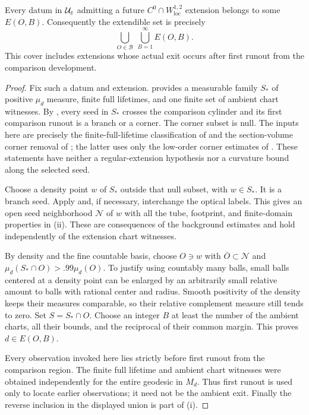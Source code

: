 \begin{proposition}
\label{prop:exit-cover}
Every datum in $\mathcal U_{\varepsilon}$ admitting a future
$C^0\cap W^{1,2}_{\mathrm{loc}}$ extension belongs to some
$E(O,B)$.  Consequently the extendible set is precisely
\[
                  \bigcup_{O\in\mathcal B}\ 
                         \bigcup_{B=1}^{\infty}E(O,B).
\]
This cover includes extensions whose actual exit occurs
after first runout from the comparison development.
\end{proposition}

\begin{proof}
Fix such a datum and extension.  
provides a measurable family $S_*$ of positive $\mu_d$ measure,
finite full lifetimes, and one finite set of ambient chart
witnesses.  By , every seed in $S_*$
crosses the comparison cylinder and its first comparison
runout is a branch or a corner.  The corner subset is null.
The inputs here are precisely the finite-full-lifetime
classification of \cite[]{KerrCTwo} and the
section-volume corner removal of
\cite[]{KerrCOne}; the latter uses only the
low-order corner estimates of
\cite[]{KerrCTwo}.  These statements have neither a
regular-extension hypothesis nor a curvature bound along
the selected seed.

Choose a density point $w$ of $S_*$ outside that null subset,
with $w\in S_*$.  It is a branch seed.  Apply
 and, if necessary, interchange the
optical labels.  This gives an open seed neighborhood $\mathcal N$ of
$w$ with all the tube, footprint, and finite-domain
properties in (ii). These are consequences of
the background estimates and hold independently of the extension
chart witnesses.

By density and the fine countable basis, choose $O\ni w$
with $\overline O\subset\mathcal N$ and
$\mu_d(S_*\cap O)>.99\mu_d(O)$.  To justify using countably
many balls, small balls centered at a density point can be
enlarged by an arbitrarily small relative amount to balls
with rational center and radius.  Smooth positivity of the
density keeps their measures comparable, so their relative
complement measure still tends to zero.  Set $S=S_*\cap O$.
Choose an integer $B$ at least the number of the ambient
charts, all their bounds, and the reciprocal of their common
margin.  This proves $d\in E(O,B)$.

Every observation invoked here lies strictly before first
runout from the comparison region.  The finite full lifetime
and ambient chart witnesses were obtained independently for
the entire geodesic in $M_d$.  Thus first runout is used only
to locate earlier observations; it need not be the ambient
exit.  Finally the reverse inclusion in the displayed union
is part of (i).
\end{proof}
